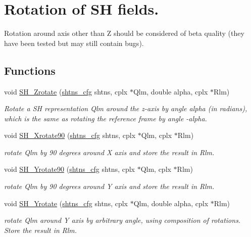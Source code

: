 \hypertarget{group__rotation}{}\section{Rotation of S\+H fields.}
\label{group__rotation}


Rotation around axis other than Z should be considered of beta quality (they have been tested but may still contain bugs).  


\subsection*{Functions}
\begin{DoxyCompactItemize}
\item 
void \hyperlink{group__rotation_ga6972fa1a3352053c8d4c6570b704505e}{S\+H\+\_\+\+Zrotate} (\hyperlink{shtns_8h_ab7bd78e5cbeb4ed18782d018195fde00}{shtns\+\_\+cfg} shtns, cplx $\ast$Qlm, double alpha, cplx $\ast$Rlm)
\begin{DoxyCompactList}\small\item\em Rotate a S\+H representation Qlm around the z-\/axis by angle alpha (in radians), which is the same as rotating the reference frame by angle -\/alpha. \end{DoxyCompactList}\item 
void \hyperlink{group__rotation_ga0f8ccf6d430fc57c7e056effbeb245b1}{S\+H\+\_\+\+Xrotate90} (\hyperlink{shtns_8h_ab7bd78e5cbeb4ed18782d018195fde00}{shtns\+\_\+cfg} shtns, cplx $\ast$Qlm, cplx $\ast$Rlm)
\begin{DoxyCompactList}\small\item\em rotate Qlm by 90 degrees around X axis and store the result in Rlm. \end{DoxyCompactList}\item 
void \hyperlink{group__rotation_gaa8001c0f7b7377f16e29b4f69ad6485c}{S\+H\+\_\+\+Yrotate90} (\hyperlink{shtns_8h_ab7bd78e5cbeb4ed18782d018195fde00}{shtns\+\_\+cfg} shtns, cplx $\ast$Qlm, cplx $\ast$Rlm)
\begin{DoxyCompactList}\small\item\em rotate Qlm by 90 degrees around Y axis and store the result in Rlm. \end{DoxyCompactList}\item 
void \hyperlink{group__rotation_ga22c7e9932a68da1f38b2306310f0ec52}{S\+H\+\_\+\+Yrotate} (\hyperlink{shtns_8h_ab7bd78e5cbeb4ed18782d018195fde00}{shtns\+\_\+cfg} shtns, cplx $\ast$Qlm, double alpha, cplx $\ast$Rlm)
\begin{DoxyCompactList}\small\item\em rotate Qlm around Y axis by arbitrary angle, using composition of rotations. Store the result in Rlm. \end{DoxyCompactList}\end{DoxyCompactItemize}



